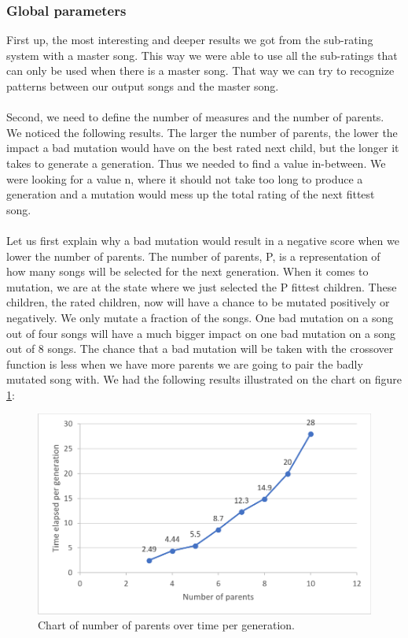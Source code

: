 \documentclass[a4paper]{article}
\begin{document}
\subsubsection{Global parameters}
First up, the most interesting and deeper results we got from the sub-rating system with a master song. This way we were able to use all the sub-ratings that can only be used when there is a master song. That way we can try to recognize patterns between our output songs and the master song.
\\\\
Second, we need to define the number of measures and the number of parents. We noticed the following results. The larger the number of parents, the lower the impact a bad mutation would have on the best rated next child, but the longer it takes to generate a generation. Thus we needed to find a value in-between. We were looking for a value n, where it should not take too long to produce a generation and a mutation would mess up the total rating of the next fittest song. 
\\\\
Let us first explain why a bad mutation would result in a negative score when we lower the number of parents. The number of parents, P, is a representation of how many songs will be selected for the next generation. When it comes to mutation, we are at the state where we just selected the P fittest children. These children, the rated children, now will have a chance to be mutated positively or negatively. We only mutate a fraction of the songs. One bad mutation on a song out of four songs will have a much bigger impact on one bad mutation on a song out of 8 songs. The chance that a bad mutation will be taken with the crossover function is less when we have more parents we are going to pair the badly mutated song with. We had the following results illustrated on the chart on figure \ref{fig:parents_time}:

\begin{figure}[H]
	\includegraphics[width=\textwidth]{Fotos/parents_time_graph.png}
	\caption{Chart of number of parents over time per generation.}
	\label{fig:parents_time}
\end{figure}
\end{document}

